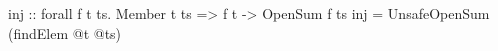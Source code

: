 \begin{code}
inj :: forall f t ts. Member t ts => f t -> OpenSum f ts
inj = UnsafeOpenSum (findElem @t @ts)
\end{code}
